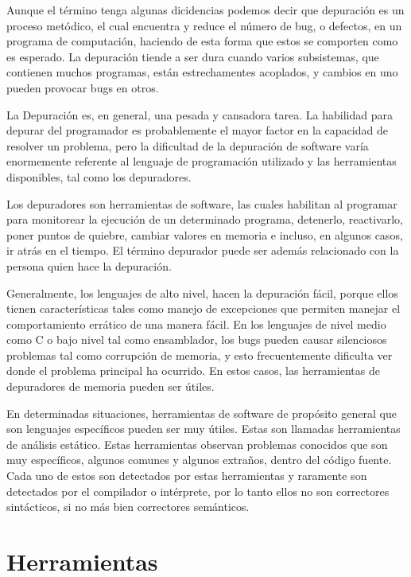 \documentclass[12pt,legalpaper]{report}
\begin{document}
Aunque el término tenga algunas dicidencias podemos decir que depuración es un proceso metódico, el cual encuentra y reduce el número de bug, o defectos, en un programa de computación, haciendo de esta forma que estos se comporten como es esperado.  La depuración tiende a ser dura cuando varios subsistemas, que contienen muchos programas, están estrechamentes acoplados, y cambios en uno pueden provocar bugs en otros.

La Depuración es, en general, una pesada y cansadora tarea.  La habilidad para depurar del programador es probablemente el mayor factor en la capacidad de resolver un problema, pero la dificultad de la depuración de software varía enormemente referente al lenguaje de programación utilizado y las herramientas disponibles, tal como los depuradores.  

Los depuradores son herramientas de software, las cuales habilitan al programar para monitorear la ejecución de un determinado programa, detenerlo, reactivarlo, poner puntos de quiebre, cambiar valores en memoria e incluso, en algunos casos, ir atrás en el tiempo.  El término depurador puede ser además relacionado con la persona quien hace la depuración.

Generalmente, los lenguajes de alto nivel, hacen la depuración fácil, porque ellos tienen características tales como manejo de excepciones que permiten manejar el comportamiento errático de una manera fácil.  En los lenguajes de nivel medio como C o bajo nivel tal como ensamblador, los bugs pueden causar silenciosos problemas tal como corrupción de memoria, y esto frecuentemente dificulta ver donde el problema principal ha ocurrido.  En estos casos, las herramientas de depuradores de memoria pueden ser útiles.

En determinadas situaciones, herramientas de software de propósito general que son lenguajes específicos pueden ser muy útiles.  Estas son llamadas herramientas de análisis estático.  Estas herramientas observan problemas conocidos que son muy específicos, algunos comunes y algunos extraños, dentro del código fuente.  Cada uno de estos son detectados por estas herramientas y raramente son detectados por el compilador o intérprete, por lo tanto ellos no son correctores sintácticos, si no más bien correctores semánticos.


	\section{Herramientas}
\end{document}
